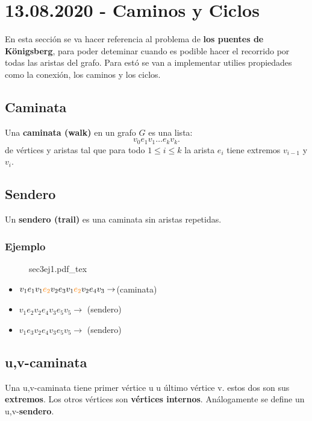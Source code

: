 \documentclass[a4paper]{book}
\newcommand{\incfig}[2][1]{%
    \def\svgwidth{#1\columnwidth}
    {#2.pdf_tex}
}
\begin{document}
\section{13.08.2020 - Caminos y Ciclos}
\label{sec:caminos_y_ciclos}

En esta sección se va hacer referencia al problema de \textbf{los puentes de
Königsberg}, para poder deteminar cuando es podible hacer el recorrido por
todas las aristas del grafo. Para estó se van a implementar utilies propiedades
como la conexión, los caminos y los ciclos.


\subsection{Caminata}
\label{ssec:caminata}

Una \textbf{caminata (walk)} en un grafo \(G\) es una lista:
\[ v_0e_1v_{1}\ldots e_{k}v_{k} .\]
 de vértices y aristas tal que para todo \(1\le i \le k\) la arista \(e_{i}\)
 tiene extremos \(v_{i-1}\) y \(v_{i}\).

\subsection{Sendero}
\label{ssec:sendero}
Un \textbf{sendero (trail)} es una caminata sin aristas repetidas.

\subsubsection{Ejemplo}
\begin{figure}[ht]
    \centering
    \incfig[0.6]{sec3ej1}
    \label{fig:sec3ej1}
\end{figure}
\begin{itemize}
    \item \(v_1e_1v_1 {\color{orange} e_2}v_2e_3v_1 {\color{orange}
        e_2}v_2e_4v_3\to\){\color{orange}(caminata)}
    \item \(v_1e_2v_2e_4v_3e_5v_5\to\){\color{teal} (sendero)}
    \item \(v_1e_3v_2e_4v_3e_5v_5\to\){\color{teal} (sendero)}
\end{itemize}



\subsection{u,v-caminata}
\label{ssec:u_v_caminata}

Una u,v-caminata tiene primer vértice u u último vértice v. estos dos son sus
\textbf{extremos}. Los otros vértices son \textbf{vértices internos}.
Análogamente se define un u,v-\textbf{sendero}.
\end{document}
